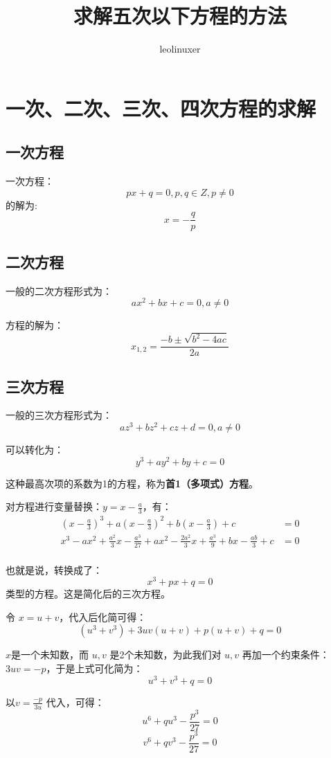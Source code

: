 \documentclass[12pt]{article}
\title{求解五次以下方程的方法\cite{From_Linear_Equation_To_Galois_Theory}}
\author{leolinuxer}
\begin{document}
\maketitle
\tableofcontents

\section{一次、二次、三次、四次方程的求解}
\subsection{一次方程}
一次方程：
$$
px + q = 0, p, q \in Z, p \ne 0
$$
的解为:
$$
x = -\frac{q}{p}
$$

\subsection{二次方程}
一般的二次方程形式为：
$$
ax^2 + bx + c = 0, a \ne 0
$$

方程的解为：
$$
x_{1,2} = \frac{-b \pm \sqrt{b^2 - 4ac}}{2a}
$$

\subsection{三次方程}
一般的三次方程形式为：
$$
az^3 + bz^2 + cz + d = 0, a \ne 0
$$

可以转化为：
$$
y^3 + ay^2 + by + c = 0
$$

这种最高次项的系数为1的方程，称为\textbf{首1（多项式）方程}。

对方程进行变量替换：$y = x - \frac{a}{3}$，有：
\begin{align*}
(x-\frac{a}{3})^3 + a(x-\frac{a}{3})^2 + b(x - \frac{a}{3}) + c &= 0 \\
x^3 - ax^2 + \frac{a^2}{3}x - \frac{a^3}{27} + ax^2 - \frac{2a^2}{3}x + \frac{a^3}{9} + bx - \frac{ab}{3} + c &= 0 \\
\end{align*}

也就是说，转换成了：
$$
x^3 + px + q = 0
$$
类型的方程。这是简化后的三次方程。

令 $x = u + v$，代入后化简可得：
$$
(u^3 + v^3) + 3uv(u+v) + p(u+v) + q = 0
$$

$x$是一个未知数，而 $u,v$ 是2个未知数，为此我们对 $u,v$ 再加一个约束条件：$3uv = -p$，于是上式可化简为：
$$
u^3 + v^3 + q = 0
$$

以$v = \frac{-p}{3u}$ 代入，可得：
$$
u^6 + qu^3 - \frac{p^3}{27} = 0
$$
$$
v^6 + qv^3 - \frac{p^3}{27} = 0
$$
\end{document}

